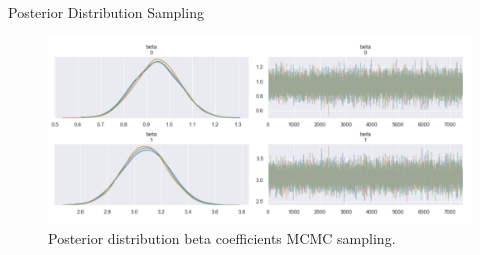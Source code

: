 \documentclass[10pt]{beamer}
\begin{document}
\begin{frame}{Posterior Distribution Sampling }{\cite{pymc3}}
\begin{center}
\begin{figure}
\includegraphics[scale=0.25]{images/lin_posterior_pymc3.png} 
\caption{Posterior distribution beta coefficients MCMC sampling.}
\end{figure}
\end{center}
\end{frame}
\end{document}
